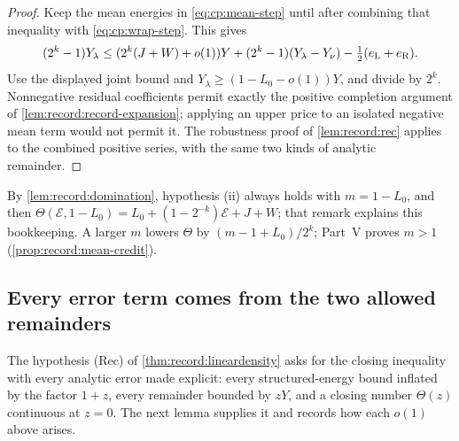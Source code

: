 \begin{proof}
Keep the mean energies in \eqref{eq:cp:mean-step} until after combining
that inequality with \eqref{eq:cp:wrap-step}. This gives
\[
 (2^k-1)Y_\lambda\le (2^k(J+W)+o(1))Y
 +(2^k-1)(Y_\lambda-Y_\nu)-\tfrac12(e_{\rm L}+e_{\rm R}).
\]
Use the displayed joint bound and
$Y_\lambda\ge(1-L_0-o(1))Y$, and divide by $2^k$.
Nonnegative residual coefficients permit exactly the positive
completion argument of \cref{lem:record:record-expansion}; applying an
upper price to an isolated negative mean term would not permit it.
The robustness proof of \cref{lem:record:rec} applies to the combined
positive series, with the same two kinds of analytic remainder.
\end{proof}

\begin{remark}\label{rem:cp:trivial-mean}
By \cref{lem:record:domination}, hypothesis (ii) always holds with
$m=1-L_0$, and then $\Theta(\mathcal E,1-L_0)=L_0+(1-2^{-k})\mathcal E+J+W$;
that remark explains this bookkeeping. A larger $m$ lowers $\Theta$ by
$(m-1+L_0)/2^k$; Part~V proves $m>1$ (\cref{prop:record:mean-credit}).
\end{remark}

\subsection{Every error term comes from the two allowed remainders}\label{subsec:cp:robust}

The hypothesis (Rec) of \cref{thm:record:lineardensity} asks for the closing
inequality with every analytic error made explicit: every structured-energy
bound inflated by the factor $1+z$, every remainder bounded by $zY$, and a
closing number $\Theta(z)$ continuous at $z=0$. The next lemma supplies it and
records how each $o(1)$ above arises.

